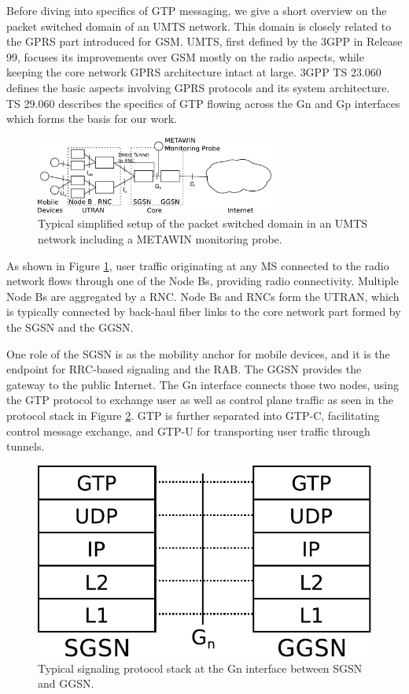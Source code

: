 Before diving into specifics of \ac{GTP} messaging, we give a short overview on the packet switched domain of an \ac{UMTS} network. This domain is closely related to the \ac{GPRS} part introduced for \acs{GSM}. \ac{UMTS}, first defined by the \ac{3GPP} in Release 99, focuses its improvements over \ac{GSM} mostly on the radio aspects, while keeping the core network \ac{GPRS} architecture intact at large. \ac{3GPP} \ac{TS} 23.060 \cite{3gpp23060} defines the basic aspects involving \ac{GPRS} protocols and its system architecture. \ac{TS} 29.060 \cite{3gpp29060} describes the specifics of \ac{GTP} flowing across the Gn and Gp interfaces which forms the basis for our work.


\begin{figure}
\centering
\includegraphics[width=0.7\textwidth]{images/CONEXT2012/umts-network.pdf}
\caption{Typical simplified setup of the packet switched domain in an \acs{UMTS} network including a METAWIN monitoring probe.}
\label{fig:umtsnetwork-CONEXT}
\end{figure}



As shown in Figure \ref{fig:umtsnetwork-CONEXT}, user traffic originating at any \ac{MS} connected to the radio network flows through one of the Node Bs, providing radio connectivity. Multiple Node Bs are aggregated by a \ac{RNC}. Node Bs and \acp{RNC} form the \ac{UTRAN}, which is typically connected by back-haul fiber links to the core network part formed by the \ac{SGSN} and the \ac{GGSN}.

One role of the \ac{SGSN} is as the mobility anchor for mobile devices, and it is the endpoint for \ac{RRC}-based signaling and the \ac{RAB}. The \ac{GGSN} provides the gateway to the public Internet. The Gn interface connects those two nodes, using the \ac{GTP} protocol to exchange user as well as control plane traffic as seen in the protocol stack in Figure \ref{fig:signallingstack-CONEXT}. \ac{GTP} is further separated into GTP-C, facilitating control message exchange, and GTP-U for transporting user traffic through tunnels.


\begin{figure}
\centering
\includegraphics[width=0.6\columnwidth]{images/CONEXT2012/signalling-stack.pdf}
\caption{Typical signaling protocol stack at the Gn interface between \ac{SGSN} and \ac{GGSN}.}
\label{fig:signallingstack-CONEXT}
\end{figure}




